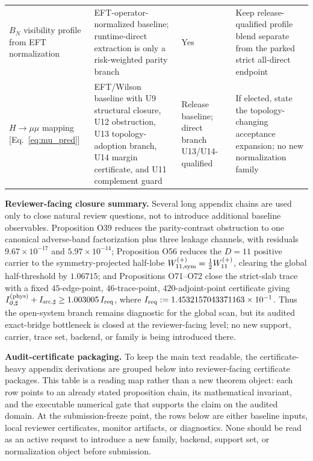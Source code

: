 \documentclass[aps,prd,onecolumn,notitlepage,nofootinbib,superscriptaddress,11pt,floatfix]{revtex4-2}
\begin{document}
\begin{table}[htbp]
\begin{tabular}{@{}l l l l@{}}
\parbox[t]{0.17\textwidth}{$B_N$ visibility profile from EFT normalization} & \parbox[t]{0.28\textwidth}{EFT-operator-normalized baseline; runtime-direct extraction is only a risk-weighted parity branch} & \parbox[t]{0.13\textwidth}{Yes} & \parbox[t]{0.24\textwidth}{Keep release-qualified profile blend separate from the parked strict all-direct endpoint} \\
\parbox[t]{0.17\textwidth}{$H\to\mu\mu$ mapping [Eq.~\eqref{eq:mu_pred}]} & \parbox[t]{0.28\textwidth}{EFT/Wilson baseline with U9 structural closure, U12 obstruction, U13 topology-adoption branch, U14 margin certificate, and U11 complement guard} & \parbox[t]{0.13\textwidth}{Release baseline; direct branch U13/U14-qualified} & \parbox[t]{0.24\textwidth}{If elected, state the topology-changing acceptance expansion; no new normalization family} \\
\bottomrule
\end{tabular}
\end{table}

\medskip\noindent\textbf{Reviewer-facing closure summary.}
Several long appendix chains are used only to close natural review questions, not to introduce additional baseline observables.  Proposition O39 reduces the parity-contrast obstruction to one canonical adverse-band factorization plus three leakage channels, with residuals \(9.67\times10^{-17}\) and \(5.97\times10^{-14}\); Proposition O56 reduces the \(D=11\) positive carrier to the symmetry-projected half-lobe \(W_{11,{\rm sym}}^{(+)}=\frac12 W_{11}^{(+)}\), clearing the global half-threshold by \(1.06715\); and Propositions O71--O72 close the strict-slab trace with a fixed \(45\)-edge-point, \(46\)-trace-point, \(420\)-adjoint-point certificate giving \(I_{\partial,\sharp}^{(\rm phys)}+I_{{\rm src},\sharp}\ge1.003005\,I_{\rm req}\), where \(I_{\rm req}:=1.4532157043371163\times10^{-1}\).  Thus the open-system branch remains diagnostic for the global scan, but its audited exact-bridge bottleneck is closed at the reviewer-facing level; no new support, carrier, trace set, backend, or family is being introduced there.

\medskip\noindent\textbf{Audit-certificate packaging.}
To keep the main text readable, the certificate-heavy appendix derivations are grouped below into reviewer-facing certificate packages.  This table is a reading map rather than a new theorem object: each row points to an already stated proposition chain, its mathematical invariant, and the executable numerical gate that supports the claim on the audited domain.
At the submission-freeze point, the rows below are either baseline inputs, local reviewer certificates, monitor artifacts, or diagnostics.  None should be read as an active request to introduce a new family, backend, support set, or normalization object before submission.
\end{document}
